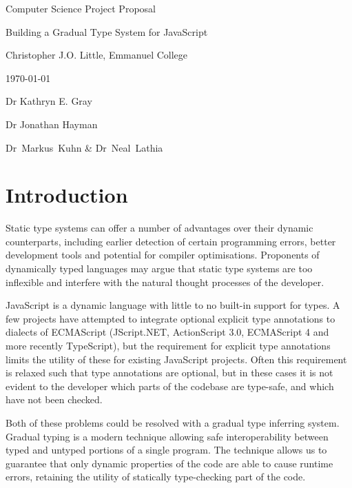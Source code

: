 \documentclass{article}
\begin{document}
	\vfil 
	\centerline{\large Computer Science Project Proposal}
	\vspace{0.4in}
	\centerline{\Large Building a Gradual Type System for JavaScript }
	\vspace{0.4in}
	\centerline{\large Christopher J.O. Little, Emmanuel College}
	\vspace{0.3in}
	\centerline{\large \today}
	\vspace{0.3in}

	 Dr Kathryn E. Gray
	\vspace{0.2in}

	 Dr Jonathan Hayman
	\vspace{0.2in}\noindent 
	
	 Dr~Markus~Kuhn \& Dr~Neal~Lathia


	\section{Introduction}\label{introduction}

		Static type systems can offer a number of advantages over their dynamic counterparts, including earlier detection of certain programming errors, better development tools and potential for compiler optimisations. Proponents of dynamically typed languages may argue that static type systems are too inflexible and interfere with the natural thought processes of the developer.
		
		JavaScript is a dynamic language with little to no built-in support for types. A few projects have attempted to integrate optional explicit type annotations to dialects of ECMAScript (JScript.NET, ActionScript 3.0, ECMAScript 4 and more recently TypeScript), but the requirement for explicit type annotations limits the utility of these for existing JavaScript projects. Often this requirement is relaxed such that type annotations are optional, but in these cases it is not evident to the developer which parts of the codebase are type-safe, and which have not been checked.

		Both of these problems could be resolved with a gradual type inferring system. Gradual typing is a modern technique allowing safe interoperability between typed and untyped portions of a single program. The technique allows us to guarantee that only dynamic properties of the code are able to cause runtime errors, retaining the utility of statically type-checking part of the code. \cite{felleisen06,findler07}
\end{document}
